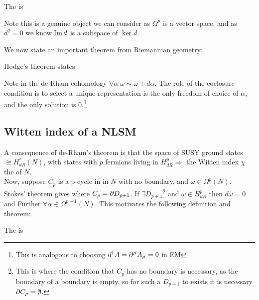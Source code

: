 \documentclass{article}
\begin{document}
\begin{definition}
	The  is 
\end{definition}
\begin{remark}
	Note this is a genuine object we can consider as $\Omega^p$ is a vector space, and as $d^2=0$ we know $\operatorname{Im} d$ is a subspace of $\ker d$. 
\end{remark}
We now state an important theorem from Riemannian geometry:
\begin{theorem}
 Hodge's theorem states 
\end{theorem}
Note in the de Rham cohomology $\forall \alpha \; \omega \sim \omega + d\alpha$. The role of the coclosure condition is to select a unique representation 
is the only freedom of choice of $\alpha$, and the only solution is 0.\footnote{This is analogous to choosing $d^\dagger A = \partial^\mu A_\mu = 0 $ in EM }
\subsection{Witten index of a NLSM}
A consequence of de-Rham's theorem is that the space of SUSY ground states $\cong H_{dR}^\ast (N)$, with states with $p$ fermions living in $H^p_{dR}\Rightarrow$ the Witten index 
$\chi$ the  of $N$. \\
Now, suppose $C_p$ is a p-cycle in in $N$ with no boundary, and $\omega \in \Omega^{p}(N)$. Stokes' theorem gives 
where $C_p = \partial D_{p+1}$. If $\exists D_{p+1}$\footnote{This is where the condition that $C_p$ has no boundary is necessary, as the boundary of a boundary is empty, so for such a $D_{p+1}$ to exists it is necessary $\partial C_p=\emptyset$.} and $\omega \in H_{dR}^p$ then $d\omega = 0$ and
Further $\forall \alpha \in \Omega^{p-1}(N)$.
This motivates the following definition and  theorem:
\begin{definition}
	The  is
\end{definition}
\end{document}
